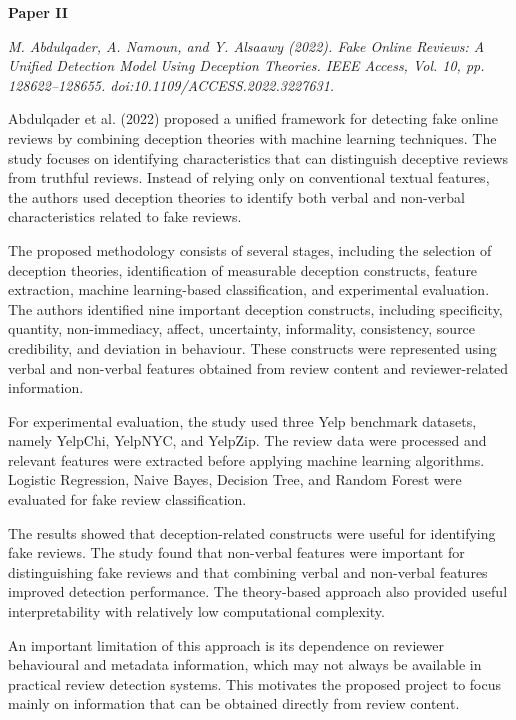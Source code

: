 \documentclass[12pt,a4paper]{report}
\begin{document}

\newpage

\textbf{Paper II}

\textit{M. Abdulqader, A. Namoun, and Y. Alsaawy (2022). Fake Online Reviews: A Unified Detection Model Using Deception Theories. IEEE Access, Vol. 10, pp. 128622--128655. doi:10.1109/ACCESS.2022.3227631.}

Abdulqader et al. (2022) proposed a unified framework for detecting fake online reviews by combining deception theories with machine learning techniques. The study focuses on identifying characteristics that can distinguish deceptive reviews from truthful reviews. Instead of relying only on conventional textual features, the authors used deception theories to identify both verbal and non-verbal characteristics related to fake reviews.

The proposed methodology consists of several stages, including the selection of deception theories, identification of measurable deception constructs, feature extraction, machine learning-based classification, and experimental evaluation. The authors identified nine important deception constructs, including specificity, quantity, non-immediacy, affect, uncertainty, informality, consistency, source credibility, and deviation in behaviour. These constructs were represented using verbal and non-verbal features obtained from review content and reviewer-related information.

For experimental evaluation, the study used three Yelp benchmark datasets, namely YelpChi, YelpNYC, and YelpZip. The review data were processed and relevant features were extracted before applying machine learning algorithms. Logistic Regression, Naive Bayes, Decision Tree, and Random Forest were evaluated for fake review classification.

The results showed that deception-related constructs were useful for identifying fake reviews. The study found that non-verbal features were important for distinguishing fake reviews and that combining verbal and non-verbal features improved detection performance. The theory-based approach also provided useful interpretability with relatively low computational complexity.

An important limitation of this approach is its dependence on reviewer behavioural and metadata information, which may not always be available in practical review detection systems. This motivates the proposed project to focus mainly on information that can be obtained directly from review content.
\end{document}
